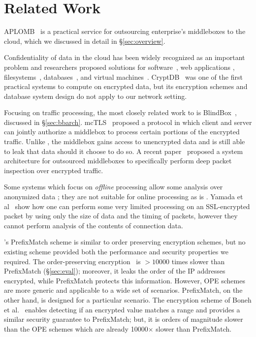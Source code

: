 
\section{Related Work}
\label{sec:related}

APLOMB~\cite{aplomb} is a practical service for outsourcing enterprise's middleboxes to the cloud, which we discussed in detail in \S\ref{sec:overview}.

Confidentiality of data in the cloud has been widely recognized as an important problem and researchers proposed solutions for software~\cite{Baumann:Haven}, web applications \cite{giffin:hails, Mylar},  filesystems~\cite{blaze:cfs, kallahalla:plutus, goh:sirius},  databases~\cite{popa:cryptdb, blindseer},  and virtual machines~\cite{Zhang:CloudVisor}. 
CryptDB~\cite{popa:cryptdb} was one of the first practical systems to compute on encrypted data, but its encryption schemes and database system design do not apply to our network setting. 

Focusing on traffic processing, the most closely related work to \sys is BlindBox~\cite{blindbox}, discussed in \S\ref{sec:bbarch}.  mcTLS~\cite{mctls} proposed a protocol in which client and server can jointly authorize a middlebox to process certain portions of the encrypted traffic. Unlike \sys, the middlebox  gains access to unencrypted data and is still able to leak that data should it choose to do so. A recent paper~\cite{secmb} proposed a system architecture for outsourced middleboxes to specifically perform deep packet inspection over encrypted traffic.

Some systems which focus on {\it offline} processing allow some analysis over anonymized data \cite{Vern:Anonymize06, Vern:Anonymize03}; they are not suitable for online processing as is \sys.
Yamada et al~\cite{Yamada_IDS} show how one can perform some very limited processing on an SSL-encrypted packet by using only the size of data and the timing of packets, however they cannot perform analysis of the contents of connection data.

\sys's PrefixMatch scheme is similar to order preserving encryption schemes, but no existing scheme provided both the performance and security properties we required.
The order-preserving encryption~\cite{boldyreva:ope, popa:mope}  is 
 $>10000$ times slower than PrefixMatch (\S\ref{sec:eval}); moreover, it leaks the order of the IP addresses encrypted, while PrefixMatch protects this information. However, OPE schemes are more generic and applicable to a wide set of scenarios. PrefixMatch, on the other hand, is designed for a particular scenario.
The encryption scheme of Boneh et al.~\cite{BonehRange} enables detecting if an encrypted value matches a range and provides a similar security guarantee to PrefixMatch; but, it is orders of magnitude slower than the OPE schemes which are already 10000$\times$ slower than PrefixMatch. 

